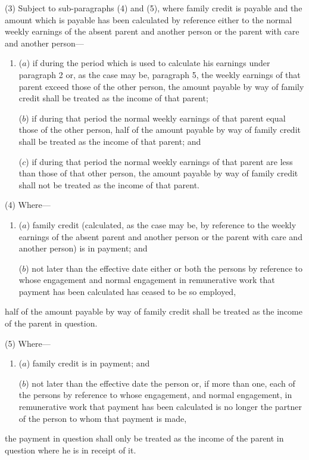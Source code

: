 \documentclass[12pt,a4paper]{article}
\begin{document}
(3) Subject to sub-paragraphs (4) and (5), where family credit is payable and the amount which is payable has been calculated by reference either to the 
normal  %
weekly earnings of the absent parent and another person or the parent with care and another person—
\begin{enumerate}\item[]
($a$) if during the period which is used to calculate his earnings under paragraph 2 or, as the case may be, paragraph 5, the weekly earnings of that parent exceed those of the other person, the amount payable by way of family credit shall be treated as the income of that parent;

($b$) if during that period the normal weekly earnings of that parent equal those of the other person, half of the amount payable by way of family credit shall be treated as the income of that parent; and

($c$) if during that period the normal weekly earnings of that parent are less than those of that other person, the amount payable by way of family credit shall not be treated as the income of that parent.
\end{enumerate}

(4) Where—
\begin{enumerate}\item[]
($a$) family credit (calculated, as the case may be, by reference to the weekly earnings of the absent parent and another person or the parent with care and another person) is in payment; and

($b$) not later than the effective date either or both the persons by reference to whose engagement and normal engagement in remunerative work that payment has been calculated has ceased to be so employed,
\end{enumerate}
half of the amount payable by way of family credit shall be treated as the income of the parent in question.

(5) Where—
\begin{enumerate}\item[]
($a$) family credit is in payment; and

($b$) not later than the effective date the person or, if more than one, each of the persons by reference to whose engagement, and normal engagement, in remunerative work that payment has been calculated is no longer the partner of the person to whom that payment is made,
\end{enumerate}
the payment in question shall only be treated as the income of the parent in question where he is in receipt of it.
\end{document}
